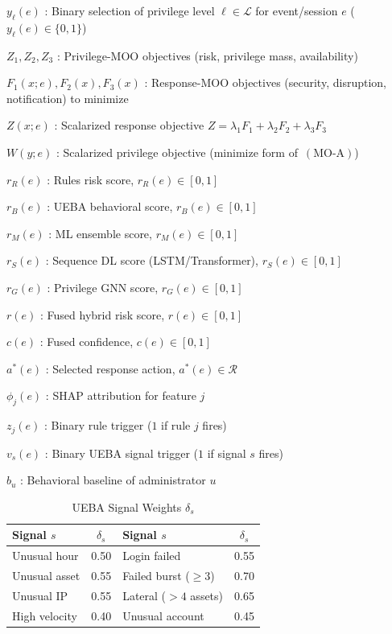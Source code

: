 $y_{\ell}(e)$ : Binary selection of privilege level $\ell\in\mathcal{L}$ for event/session $e$ ($y_{\ell}(e)\in\{0,1\}$)

$Z_1,Z_2,Z_3$ : Privilege-MOO objectives (risk, privilege mass, availability)

$F_1(x;e),F_2(x),F_3(x)$ : Response-MOO objectives (security, disruption, notification) to minimize

$Z(x;e)$ : Scalarized response objective $Z=\lambda_1 F_1+\lambda_2 F_2+\lambda_3 F_3$

$W(y;e)$ : Scalarized privilege objective (minimize form of~$(\mathrm{MO}\text{-}\mathrm{A})$)

$r_R(e)$ : Rules risk score, $r_R(e)\in[0,1]$

$r_B(e)$ : UEBA behavioral score, $r_B(e)\in[0,1]$

$r_M(e)$ : ML ensemble score, $r_M(e)\in[0,1]$

$r_S(e)$ : Sequence DL score (LSTM/Transformer), $r_S(e)\in[0,1]$

$r_G(e)$ : Privilege GNN score, $r_G(e)\in[0,1]$

$r(e)$ : Fused hybrid risk score, $r(e)\in[0,1]$

$c(e)$ : Fused confidence, $c(e)\in[0,1]$

$a^*(e)$ : Selected response action, $a^*(e)\in\mathcal{R}$

$\phi_j(e)$ : SHAP attribution for feature $j$

$z_j(e)$ : Binary rule trigger ($1$ if rule $j$ fires)

$v_s(e)$ : Binary UEBA signal trigger ($1$ if signal $s$ fires)

$b_u$ : Behavioral baseline of administrator $u$
\begin{table}[H]
\caption{UEBA Signal Weights $\delta_s$}
\label{art-tab:ueba-signals}
\centering
\footnotesize
\begin{tabular}{lc|lc}
\toprule
\textbf{Signal} $s$ & $\delta_s$ & \textbf{Signal} $s$ & $\delta_s$ \\
\midrule
Unusual hour & 0.50 & Login failed & 0.55 \\
Unusual asset & 0.55 & Failed burst ($\geq 3$) & 0.70 \\
Unusual IP & 0.55 & Lateral ($>4$ assets) & 0.65 \\
High velocity & 0.40 & Unusual account & 0.45 \\
\bottomrule
\end{tabular}
\end{table}

